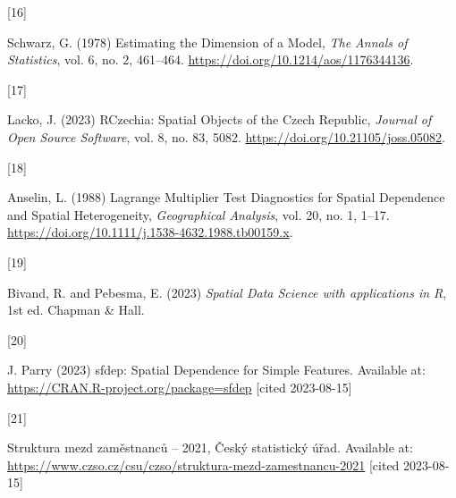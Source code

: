 \documentclass{mmeproc}
\newlength{\cslhangindent}
\newlength{\csllabelwidth}
\newenvironment{CSLReferences}[2] %
 {%
  \setlength{\parindent}{0pt}
  \ifodd #1
  \fi
  \setlength{\parskip}{-2pt}
 }%
 {}
\newcommand{\CSLLeftMargin}[1]{\parbox[t]{\csllabelwidth}{#1}}
\newcommand{\CSLRightInline}[1]{\parbox[t]{\linewidth - \csllabelwidth}{#1}\break}
\begin{document}
\begin{CSLReferences}{0}{0}
\leavevmode{}%
\CSLLeftMargin{{[}16{]} }%
\CSLRightInline{Schwarz, G. (1978) {Estimating the {Dimension} of a
{Model},} \emph{The Annals of Statistics}, vol. 6, no. 2, 461--464.
\url{https://doi.org/10.1214/aos/1176344136}.}

\leavevmode{}%
\CSLLeftMargin{{[}17{]} }%
\CSLRightInline{Lacko, J. (2023)  {{RCzechia}: {Spatial} {Objects} of the
{Czech} {Republic},} \emph{Journal of Open Source Software}, vol. 8,
no. 83, 5082. \url{https://doi.org/10.21105/joss.05082}.}

\leavevmode{}%
\CSLLeftMargin{{[}18{]} }%
\CSLRightInline{Anselin, L. (1988) {Lagrange {Multiplier} {Test}
{Diagnostics} for {Spatial} {Dependence} and {Spatial}
{Heterogeneity},} \emph{Geographical Analysis}, vol. 20, no. 1,
1--17. \url{https://doi.org/10.1111/j.1538-4632.1988.tb00159.x}.}

\leavevmode{}%
\CSLLeftMargin{{[}19{]} }%
\CSLRightInline{Bivand, R. and Pebesma, E. (2023) \emph{Spatial {Data} {Science}
with applications in {R}}, 1st ed. Chapman \& Hall.}

\leavevmode{}%
\CSLLeftMargin{{[}20{]} }%
\CSLRightInline{J. Parry (2023) {{sfdep}: {Spatial} {Dependence} for
{Simple} {Features}.} Available at:
\url{https://CRAN.R-project.org/package=sfdep} {{[}cited 2023-08-15{]}}}

\leavevmode{}%
\CSLLeftMargin{{[}21{]} }%
\CSLRightInline{{Struktura mezd zaměstnanců -- 2021,} Český
statistický úřad. Available at:
\url{https://www.czso.cz/csu/czso/struktura-mezd-zamestnancu-2021} {{[}cited 2023-08-15{]}}}

\end{CSLReferences}
\end{document}
